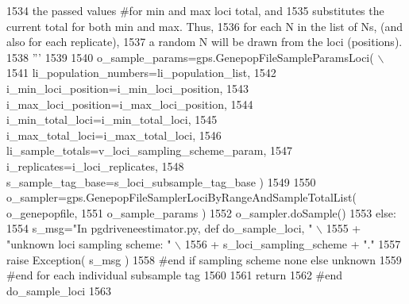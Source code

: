 \begin{DoxyCode}
1534 \textcolor{stringliteral}{            the passed values #for min and max loci total, and }
1535 \textcolor{stringliteral}{            substitutes the current total for both min and max. Thus,}
1536 \textcolor{stringliteral}{            for each N in the list of Ns, (and also for each replicate),  }
1537 \textcolor{stringliteral}{            a random N will be drawn from the loci (positions). }
1538 \textcolor{stringliteral}{            '''}
1539 
1540             o\_sample\_params=gps.GenepopFileSampleParamsLoci( \(\backslash\)
1541                                         li\_population\_numbers=li\_population\_list,
1542                                         i\_min\_loci\_position=i\_min\_loci\_position,
1543                                         i\_max\_loci\_position=i\_max\_loci\_position,
1544                                         i\_min\_total\_loci=i\_min\_total\_loci,
1545                                         i\_max\_total\_loci=i\_max\_total\_loci,
1546                                         li\_sample\_totals=v\_loci\_sampling\_scheme\_param,
1547                                         i\_replicates=i\_loci\_replicates,
1548                                         s\_sample\_tag\_base=s\_loci\_subsample\_tag\_base )
1549 
1550             o\_sampler=gps.GenepopFileSamplerLociByRangeAndSampleTotalList( o\_genepopfile,
1551                                                                             o\_sample\_params )
1552             o\_sampler.doSample()
1553         \textcolor{keywordflow}{else}:
1554             s\_msg=\textcolor{stringliteral}{"In pgdriveneestimator.py, def do\_sample\_loci, "} \(\backslash\)
1555                         + \textcolor{stringliteral}{"unknown loci sampling scheme: "} \(\backslash\)
1556                         + s\_loci\_sampling\_scheme + \textcolor{stringliteral}{"."}
1557             \textcolor{keywordflow}{raise} Exception( s\_msg )
1558         \textcolor{comment}{#end if sampling scheme none else unknown}
1559     \textcolor{comment}{#end for each individual subsample tag}
1560 
1561     \textcolor{keywordflow}{return}
1562 \textcolor{comment}{#end do\_sample\_loci}
1563 
\end{DoxyCode}
